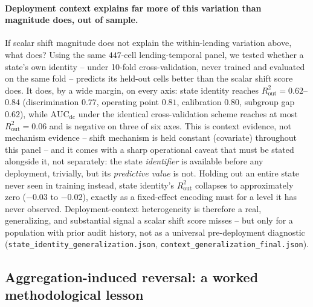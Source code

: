 \documentclass[11pt]{article}
\begin{document}
\paragraph{Deployment context explains far more of this variation than magnitude does, out of
sample.} If scalar shift magnitude does not explain the within-lending variation above, what does?
Using the same $447$-cell lending-temporal panel, we tested whether a state's own identity --
under 10-fold cross-validation, never trained and evaluated on the same fold -- predicts its
held-out cells better than the scalar shift score does. It does, by a wide margin, on every axis:
state identity reaches $R^2_{\text{out}}=0.62$--$0.84$ (discrimination $0.77$, operating point
$0.81$, calibration $0.80$, subgroup gap $0.62$), while $\text{AUC}_{\text{dc}}$ under the identical
cross-validation scheme reaches at most $R^2_{\text{out}}=0.06$ and is negative on three of six
axes. This is context evidence, not mechanism evidence -- shift mechanism is held constant
(covariate) throughout this panel -- and it comes with a sharp operational caveat that must be
stated alongside it, not separately: the state \emph{identifier} is available before any
deployment, trivially, but its \emph{predictive value} is not. Holding out an entire state never
seen in training instead, state identity's $R^2_{\text{out}}$ collapses to approximately zero
($-0.03$ to $-0.02$), exactly as a fixed-effect encoding must for a level it has never observed.
Deployment-context heterogeneity is therefore a real, generalizing, and substantial signal a scalar
shift score misses -- but only for a population with prior audit history, not as a universal
pre-deployment diagnostic (\texttt{state\_identity\_generalization.json},
\texttt{context\_generalization\_final.json}).

\subsection{Aggregation-induced reversal: a worked methodological lesson}\label{sec:res-aggregation}
\end{document}
